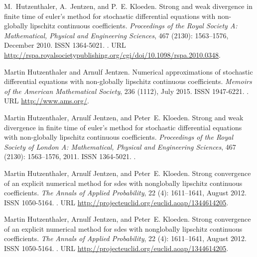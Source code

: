 \documentclass[sort&compress, preprint]{elsarticle}
\theoremstyle{definition}
\theoremstyle{plain}%
\theoremstyle{remark}
\begin{document}
\begin{thebibliography}{36}
M.~Hutzenthaler, A.~Jentzen, and P.~E. Kloeden.
\newblock Strong and weak divergence in finite time of euler's method for
  stochastic differential equations with non-globally lipschitz continuous
  coefficients.
\newblock \emph{Proceedings of the Royal Society A: Mathematical, Physical and
  Engineering Sciences}, 467 (2130): 1563--1576, December
  2010.
\newblock ISSN 1364-5021.
\newblock {}.
\newblock URL
  \url{http://rspa.royalsocietypublishing.org/cgi/doi/10.1098/rspa.2010.0348}.

Martin Hutzenthaler and Arnulf Jentzen.
\newblock Numerical approximations of stochastic differential equations with
  non-globally lipschitz continuous coefficients.
\newblock \emph{Memoirs of the American Mathematical Society}, 236
  (1112), July 2015.
\newblock ISSN 1947-6221.
\newblock {}.
\newblock URL \url{http://www.ams.org/}.

Martin Hutzenthaler, Arnulf Jentzen, and Peter~E. Kloeden.
\newblock Strong and weak divergence in finite time of euler's method for
  stochastic differential equations with non-globally lipschitz continuous
  coefficients.
\newblock \emph{Proceedings of the Royal Society of London A: Mathematical,
  Physical and Engineering Sciences}, 467 (2130): 1563--1576,
  2011.
\newblock ISSN 1364-5021.
\newblock {}.

Martin Hutzenthaler, Arnulf Jentzen, and Peter~E. Kloeden.
\newblock Strong convergence of an explicit numerical method for sdes with
  nonglobally lipschitz continuous coefficients.
\newblock \emph{The Annals of Applied Probability}, 22 (4):
  1611--1641, August 2012{}.
\newblock ISSN 1050-5164.
\newblock {}.
\newblock URL \url{http://projecteuclid.org/euclid.aoap/1344614205}.

Martin Hutzenthaler, Arnulf Jentzen, and Peter~E. Kloeden.
\newblock Strong convergence of an explicit numerical method for sdes with
  nonglobally lipschitz continuous coefficients.
\newblock \emph{The Annals of Applied Probability}, 22 (4):
  1611--1641, August 2012{}.
\newblock ISSN 1050-5164.
\newblock {}.
\newblock URL \url{http://projecteuclid.org/euclid.aoap/1344614205}.


\end{thebibliography}
\end{document}
